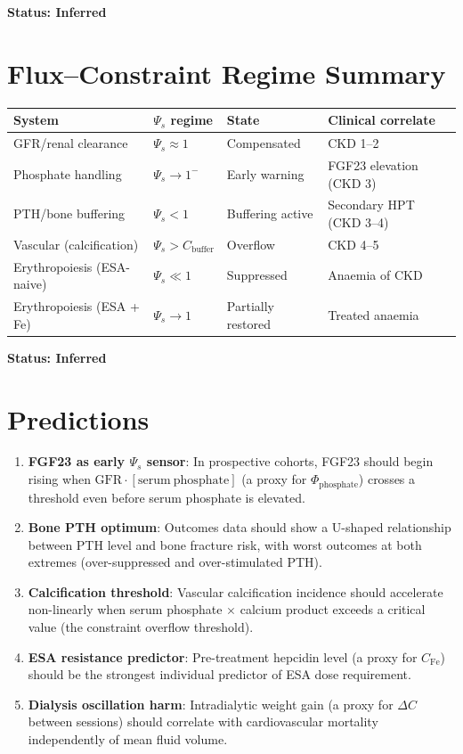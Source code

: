 \documentclass[12pt,a4paper]{article}
\begin{document}
\textbf{Status: Inferred}

\section{Flux--Constraint Regime Summary}

\begin{center}
\begin{tabular}{llll}
\toprule
System & $\Psi_s$ regime & State & Clinical correlate \\
\midrule
GFR/renal clearance & $\Psi_s \approx 1$ & Compensated & CKD 1--2 \\
Phosphate handling & $\Psi_s \to 1^-$ & Early warning & FGF23 elevation (CKD 3) \\
PTH/bone buffering & $\Psi_s < 1$ & Buffering active & Secondary HPT (CKD 3--4) \\
Vascular (calcification) & $\Psi_s > C_{\mathrm{buffer}}$ & Overflow & CKD 4--5 \\
Erythropoiesis (ESA-naive) & $\Psi_s \ll 1$ & Suppressed & Anaemia of CKD \\
Erythropoiesis (ESA + Fe) & $\Psi_s \to 1$ & Partially restored & Treated anaemia \\
\bottomrule
\end{tabular}
\end{center}

\textbf{Status: Inferred}

\section{Predictions}

\begin{enumerate}
    \item \textbf{FGF23 as early $\Psi_s$ sensor}: In prospective cohorts, FGF23 should begin rising when $\mathrm{GFR} \cdot \mathrm{[serum\ phosphate]}$ (a proxy for $\Phi_{\mathrm{phosphate}}$) crosses a threshold even before serum phosphate is elevated.
    \item \textbf{Bone PTH optimum}: Outcomes data should show a U-shaped relationship between PTH level and bone fracture risk, with worst outcomes at both extremes (over-suppressed and over-stimulated PTH).
    \item \textbf{Calcification threshold}: Vascular calcification incidence should accelerate non-linearly when serum phosphate $\times$ calcium product exceeds a critical value (the constraint overflow threshold).
    \item \textbf{ESA resistance predictor}: Pre-treatment hepcidin level (a proxy for $C_{\mathrm{Fe}}$) should be the strongest individual predictor of ESA dose requirement.
    \item \textbf{Dialysis oscillation harm}: Intradialytic weight gain (a proxy for $\Delta C$ between sessions) should correlate with cardiovascular mortality independently of mean fluid volume.
\end{enumerate}
\end{document}
